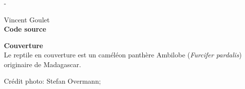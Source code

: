 
\begingroup
\calccentering{\unitlength}
\begin{adjustwidth*}{\unitlength}{-\unitlength}
  \setlength{\parindent}{0pt}
  \setlength{\parskip}{\baselineskip}

  {\textcopyright} {\year} Vincent Goulet \\

  

  \textbf{Code source} \\
  \viewsource{\ghurl}

  \textbf{Couverture} \\
  Le reptile en couverture est un caméléon panthère Ambilobe
  (\emph{Furcifer pardalis}) originaire de Madagascar.

  Crédit photo: Stefan Overmann; 
\end{adjustwidth*}
\endgroup

